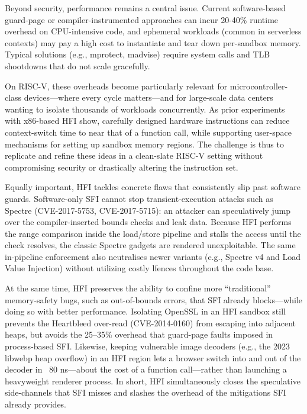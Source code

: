 \documentclass[conference,compsoc]{IEEEtran}
\begin{document}
Beyond security, performance remains a central issue. Current software-based guard-page or compiler-instrumented approaches can incur 20-40\% runtime overhead on CPU-intensive code, and ephemeral workloads (common in serverless contexts) may pay a high cost to instantiate and tear down per-sandbox memory. Typical solutions (e.g., mprotect, madvise) require system calls and TLB shootdowns that do not scale gracefully.

On RISC-V, these overheads become particularly relevant for microcontroller-class devices—where every cycle matters—and for large-scale data centers wanting to isolate thousands of workloads concurrently. As prior experiments with x86-based HFI show, carefully designed hardware instructions can reduce context-switch time to near that of a function call, while supporting user-space mechanisms for setting up sandbox memory regions. The challenge is thus to replicate and refine these ideas in a clean-slate RISC-V setting without compromising security or drastically altering the instruction set.

Equally important, HFI tackles concrete flaws that consistently slip past software guards. Software-only SFI cannot stop transient-execution attacks such as Spectre (CVE-2017-5753, CVE-2017-5715): an attacker can speculatively jump over the compiler-inserted bounds checks and leak data. Because HFI performs the range comparison inside the load/store pipeline and stalls the access until the check resolves, the classic Spectre gadgets are rendered unexploitable. The same in-pipeline enforcement also neutralises newer variants (e.g., Spectre v4 and Load Value Injection) without utilizing costly lfences throughout the code base.

At the same time, HFI preserves the ability to confine more “traditional” memory-safety bugs, such as out-of-bounds errors, that SFI already blocks—while doing so with better performance. Isolating OpenSSL in an HFI sandbox still prevents the Heartbleed over-read (CVE-2014-0160) from escaping into adjacent heaps, but avoids the 25–35\% overhead that guard-page faults imposed in process-based SFI. Likewise, keeping vulnerable image decoders (e.g., the 2023 libwebp heap overflow) in an HFI region lets a browser switch into and out of the decoder in ~80 ns—about the cost of a function call—rather than launching a heavyweight renderer process. In short, HFI simultaneously closes the speculative side-channels that SFI misses and slashes the overhead of the mitigations SFI already provides.
\end{document}
